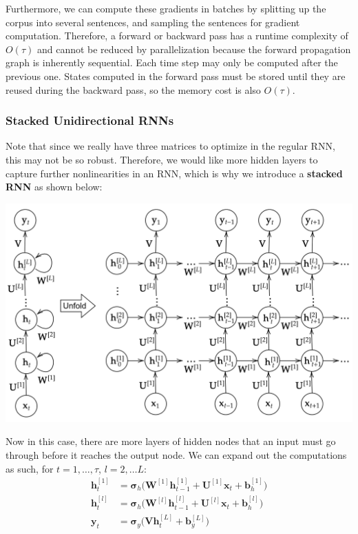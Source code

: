\documentclass{article}
\begin{document}
      Furthermore, we can compute these gradients in batches by splitting up the corpus into several sentences, and sampling the sentences for gradient computation. Therefore, a forward or backward pass has a runtime complexity of $O(\tau)$ and cannot be reduced by parallelization because the forward propagation graph is inherently sequential. Each time step may only be computed after the previous one. States computed in the forward pass must be stored until they are reused during the backward pass, so the memory cost is also $O(\tau)$. 

    \subsubsection{Stacked Unidirectional RNNs}

      Note that since we really have three matrices to optimize in the regular RNN, this may not be so robust. Therefore, we would like more hidden layers to capture further nonlinearities in an RNN, which is why we introduce a \textbf{stacked RNN} as shown below: 
      \begin{center}
          \includegraphics[scale=0.3]{img/04_RNN/Multilayer_RNN.png}
      \end{center}
      Now in this case, there are more layers of hidden nodes that an input must go through before it reaches the output node. We can expand out the computations as such, for $t = 1, \ldots, \tau$, $l = 2, \ldots L$: 
      \begin{align*}
          \mathbf{h}_t^{[1]} & = \boldsymbol{\sigma}_h \big( \mathbf{W}^{[1]} \mathbf{h}_{t-1}^{[1]} + \mathbf{U}^{[1]} \mathbf{x}_t + \mathbf{b}_h^{[1]} \big) \\
          \mathbf{h}_t^{[l]} & = \boldsymbol{\sigma}_h \big( \mathbf{W}^{[l]} \mathbf{h}_{t-1}^{[l]} + \mathbf{U}^{[l]} \mathbf{x}_t + \mathbf{b}_h^{[l]} \big) \\
          \mathbf{y}_t & = \boldsymbol{\sigma}_y \big( \mathbf{V} \mathbf{h}_t^{[L]} + \mathbf{b}_y^{[L]} \big) 
      \end{align*}
\end{document}
